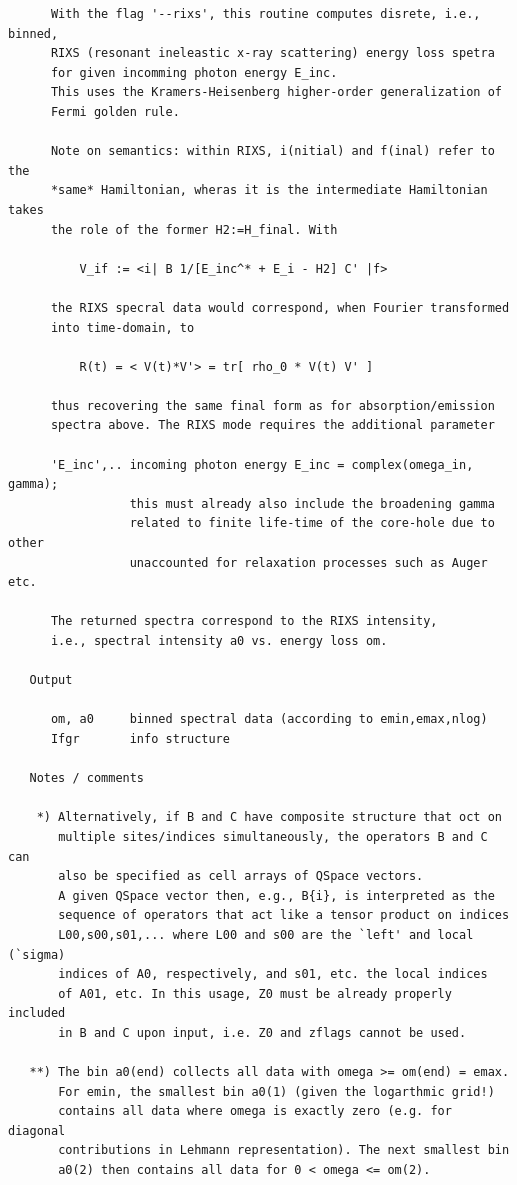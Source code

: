 \documentclass[twoside,12pt]{article}
\begin{document}
\begin{verbatim}
      With the flag '--rixs', this routine computes disrete, i.e., binned,
      RIXS (resonant ineleastic x-ray scattering) energy loss spetra
      for given incomming photon energy E_inc.
      This uses the Kramers-Heisenberg higher-order generalization of
      Fermi golden rule.
 
      Note on semantics: within RIXS, i(nitial) and f(inal) refer to the
      *same* Hamiltonian, wheras it is the intermediate Hamiltonian takes
      the role of the former H2:=H_final. With
 
          V_if := <i| B 1/[E_inc^* + E_i - H2] C' |f>
 
      the RIXS specral data would correspond, when Fourier transformed
      into time-domain, to
 
          R(t) = < V(t)*V'> = tr[ rho_0 * V(t) V' ]
 
      thus recovering the same final form as for absorption/emission
      spectra above. The RIXS mode requires the additional parameter
 
      'E_inc',.. incoming photon energy E_inc = complex(omega_in, gamma);
                 this must already also include the broadening gamma
                 related to finite life-time of the core-hole due to other
                 unaccounted for relaxation processes such as Auger etc.
 
      The returned spectra correspond to the RIXS intensity,
      i.e., spectral intensity a0 vs. energy loss om.
 
   Output
 
      om, a0     binned spectral data (according to emin,emax,nlog)
      Ifgr       info structure
 
   Notes / comments
 
    *) Alternatively, if B and C have composite structure that oct on
       multiple sites/indices simultaneously, the operators B and C can
       also be specified as cell arrays of QSpace vectors.
       A given QSpace vector then, e.g., B{i}, is interpreted as the
       sequence of operators that act like a tensor product on indices
       L00,s00,s01,... where L00 and s00 are the `left' and local (`sigma)
       indices of A0, respectively, and s01, etc. the local indices
       of A01, etc. In this usage, Z0 must be already properly included
       in B and C upon input, i.e. Z0 and zflags cannot be used.
 
   **) The bin a0(end) collects all data with omega >= om(end) = emax.
       For emin, the smallest bin a0(1) (given the logarthmic grid!)
       contains all data where omega is exactly zero (e.g. for diagonal
       contributions in Lehmann representation). The next smallest bin
       a0(2) then contains all data for 0 < omega <= om(2).
  

\end{verbatim}
\end{document}
